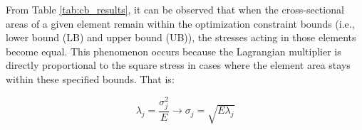 From Table \ref{tab:cb_results}, it can be observed that when the cross-sectional areas of a given element remain within the optimization constraint bounds (i.e., lower bound (LB) and upper bound (UB)), the stresses acting in those elements become equal.
This phenomenon occurs because the Lagrangian multiplier is directly proportional to the square stress in cases where the element area stays within these specified bounds.
That is:

\begin{equation}
    \lambda_j = \frac{\sigma_j^2}{E} \rightarrow \sigma_j = \sqrt{E \lambda_j}
\end{equation}